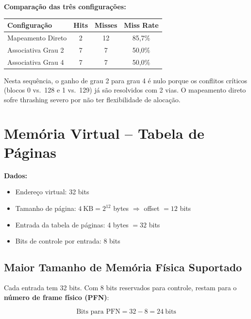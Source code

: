 \documentclass[12pt, a4paper]{article}
\begin{document}
\begin{caixaverde}
  \textbf{Comparação das três configurações:}

  \vspace{4pt}
  \begin{tabular}{lccc}
    \toprule
    \textbf{Configuração} & \textbf{Hits} & \textbf{Misses} & \textbf{Miss Rate}\\
    \midrule
    Mapeamento Direto   & 2 & 12 & 85,7\% \\
    Associativa Grau 2  & 7 & 7  & 50,0\% \\
    Associativa Grau 4  & 7 & 7  & 50,0\% \\
    \bottomrule
  \end{tabular}

  \vspace{4pt}
  Nesta sequência, o ganho de grau 2 para grau 4 é nulo porque os conflitos
  críticos (blocos 0 vs.\ 128 e 1 vs.\ 129) já são resolvidos com 2 vias.
  O mapeamento direto sofre thrashing severo por não ter flexibilidade de alocação.
\end{caixaverde}

\section{Memória Virtual -- Tabela de Páginas}

\textbf{Dados:}
\begin{itemize}[noitemsep]
  \item Endereço virtual: 32 bits
  \item Tamanho de página: $4\ \mathrm{KB} = 2^{12}$ bytes $\Rightarrow$ offset $= 12$ bits
  \item Entrada da tabela de páginas: 4 bytes $= 32$ bits
  \item Bits de controle por entrada: 8 bits
\end{itemize}

\subsection{Maior Tamanho de Memória Física Suportado}

Cada entrada tem 32 bits. Com 8 bits reservados para controle, restam para o
\textbf{número de frame físico (PFN)}:

\[
  \text{Bits para PFN} = 32 - 8 = 24\ \text{bits}
\]
\end{document}
